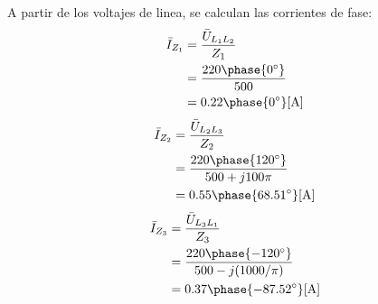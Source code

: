 \documentclass[letter,11pt]{article}
\begin{document}
A partir de los voltajes de linea, se calculan las corrientes de fase:
\begin{equation*}
    \begin{split}
        \bar{I}_{Z_1} &= \frac{\bar{U}_{L_1L_2}}{Z_1}\\
                      &= \frac{220\phase{0^{\circ}}}{500}\\
                      &= 0.22\phase{0^{\circ}}[\text{A}]\\
    \end{split}
\end{equation*}
\begin{equation*}
    \begin{split}
        \bar{I}_{Z_2} &= \frac{\bar{U}_{L_2L_3}}{Z_2}\\
                      &= \frac{220\phase{120^{\circ}}}{500+j100\pi}\\
                      &= 0.55\phase{68.51^{\circ}}[\text{A}]\\
    \end{split}
\end{equation*}
\begin{equation*}
    \begin{split}
        \bar{I}_{Z_3} &= \frac{\bar{U}_{L_3L_1}}{Z_3}\\
                      &= \frac{220\phase{-120^{\circ}}}{500-j(1000/\pi)}\\
                      &= 0.37\phase{-87.52^{\circ}}[\text{A}]\\
    \end{split}
\end{equation*}
\end{document}
